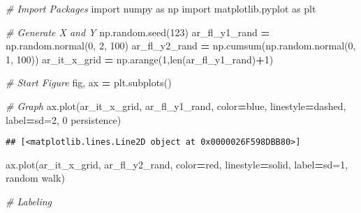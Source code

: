 \documentclass[
]{book}
\newenvironment{Shaded}{\begin{snugshade}}{\end{snugshade}}
\newcommand{\BuiltInTok}[1]{#1}
\newcommand{\CommentTok}[1]{\textcolor[rgb]{0.56,0.35,0.01}{\textit{#1}}}
\newcommand{\DecValTok}[1]{\textcolor[rgb]{0.00,0.00,0.81}{#1}}
\newcommand{\ImportTok}[1]{#1}
\newcommand{\NormalTok}[1]{#1}
\newcommand{\OperatorTok}[1]{\textcolor[rgb]{0.81,0.36,0.00}{\textbf{#1}}}
\newcommand{\StringTok}[1]{\textcolor[rgb]{0.31,0.60,0.02}{#1}}
\begin{document}
\begin{Shaded}
\begin{Highlighting}[]
\CommentTok{\# Import Packages}
\ImportTok{import}\NormalTok{ numpy }\ImportTok{as}\NormalTok{ np}
\ImportTok{import}\NormalTok{ matplotlib.pyplot }\ImportTok{as}\NormalTok{ plt}

\CommentTok{\# Generate X and Y}
\NormalTok{np.random.seed(}\DecValTok{123}\NormalTok{)}
\NormalTok{ar\_fl\_y1\_rand }\OperatorTok{=}\NormalTok{ np.random.normal(}\DecValTok{0}\NormalTok{, }\DecValTok{2}\NormalTok{, }\DecValTok{100}\NormalTok{)}
\NormalTok{ar\_fl\_y2\_rand }\OperatorTok{=}\NormalTok{ np.cumsum(np.random.normal(}\DecValTok{0}\NormalTok{, }\DecValTok{1}\NormalTok{, }\DecValTok{100}\NormalTok{))}
\NormalTok{ar\_it\_x\_grid }\OperatorTok{=}\NormalTok{ np.arange(}\DecValTok{1}\NormalTok{,}\BuiltInTok{len}\NormalTok{(ar\_fl\_y1\_rand)}\OperatorTok{+}\DecValTok{1}\NormalTok{)}

\CommentTok{\# Start Figure}
\NormalTok{fig, ax }\OperatorTok{=}\NormalTok{ plt.subplots()}

\CommentTok{\# Graph}
\NormalTok{ax.plot(ar\_it\_x\_grid, ar\_fl\_y1\_rand,}
\NormalTok{                     color}\OperatorTok{=}\StringTok{\textquotesingle{}blue\textquotesingle{}}\NormalTok{, linestyle}\OperatorTok{=}\StringTok{\textquotesingle{}dashed\textquotesingle{}}\NormalTok{,}
\NormalTok{                     label}\OperatorTok{=}\StringTok{\textquotesingle{}sd=2, 0 persistence\textquotesingle{}}\NormalTok{)}
\end{Highlighting}
\end{Shaded}

\begin{verbatim}
## [<matplotlib.lines.Line2D object at 0x0000026F598DBB80>]
\end{verbatim}

\begin{Shaded}
\begin{Highlighting}[]
\NormalTok{ax.plot(ar\_it\_x\_grid, ar\_fl\_y2\_rand,}
\NormalTok{                     color}\OperatorTok{=}\StringTok{\textquotesingle{}red\textquotesingle{}}\NormalTok{, linestyle}\OperatorTok{=}\StringTok{\textquotesingle{}solid\textquotesingle{}}\NormalTok{,}
\NormalTok{                     label}\OperatorTok{=}\StringTok{\textquotesingle{}sd=1, random walk\textquotesingle{}}\NormalTok{)}
                     
\CommentTok{\# Labeling}
\end{Highlighting}
\end{Shaded}
\end{document}

